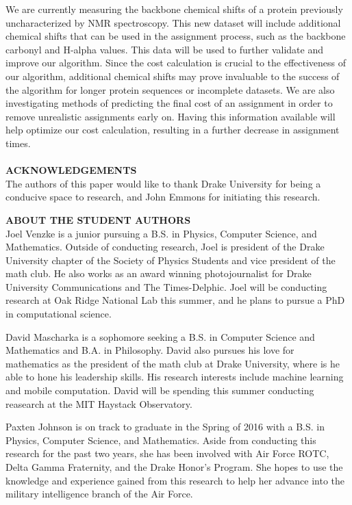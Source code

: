 \documentclass{article}
\begin{document}
\indent We are currently measuring the backbone chemical shifts of a protein previously uncharacterized by NMR spectroscopy. This new dataset will include additional chemical shifts that can be used in the assignment process, such as the backbone carbonyl and H-alpha values. This data will be used to further validate and improve our algorithm. Since the cost calculation is crucial to the effectiveness of our algorithm, additional chemical shifts may prove invaluable to the success of the algorithm for longer protein sequences or incomplete datasets. We are also investigating methods of predicting the final cost of an assignment in order to remove unrealistic assignments early on. Having this information available will help optimize our cost calculation, resulting in a further decrease in assignment times. 
\\\\
\textbf{ACKNOWLEDGEMENTS}
\\
\indent The authors of this paper would like to thank Drake University for being a conducive space to research, and John Emmons for initiating this research.
\renewcommand{\refname}{\normalfont\selectfont\large \textbf{REFERENCES}}



\vspace{1cm}
\noindent\textbf{ABOUT THE STUDENT AUTHORS}\\
\noindent Joel Venzke is a junior pursuing a B.S. in Physics, Computer Science, and  Mathematics. Outside of conducting research, Joel is president of the Drake University chapter of the Society of Physics Students and vice president of the math club. He also works as an award winning photojournalist for Drake University Communications and The Times-Delphic. Joel will be conducting research at Oak Ridge National Lab this summer, and he plans to pursue a PhD in computational science.

\noindent David Mascharka is a sophomore seeking a B.S. in Computer Science and Mathematics and B.A. in Philosophy. David also pursues his love for mathematics as the president of the math club at Drake University, where is he able to hone his leadership skills. His research interests include machine learning and mobile computation. David will be spending this summer conducting reasearch at the MIT Haystack Observatory.

\noindent Paxten Johnson is on track to graduate in the Spring of 2016 with a B.S. in Physics, Computer Science, and Mathematics. Aside from conducting this research for the past two years, she has been involved with Air Force ROTC, Delta Gamma Fraternity, and the Drake Honor's Program. She hopes to use the knowledge and experience gained from this research to help her advance into the military intelligence branch of the Air Force.
\end{document}
